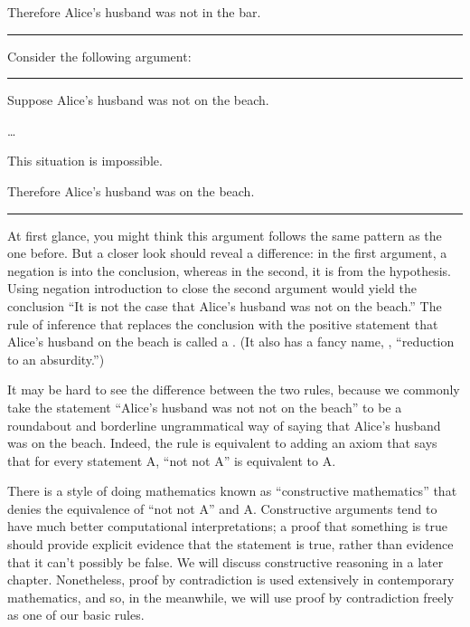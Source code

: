 \documentclass[letterpaper,10pt,english]{sphinxmanual}
\begin{document}
\sphinxAtStartPar
Therefore Alice’s husband was not in the bar.


\bigskip\hrule\bigskip


\sphinxAtStartPar
Consider the following argument:


\bigskip\hrule\bigskip


\sphinxAtStartPar
Suppose Alice’s husband was not on the beach.

\sphinxAtStartPar
…

\sphinxAtStartPar
This situation is impossible.

\sphinxAtStartPar
Therefore Alice’s husband was on the beach.


\bigskip\hrule\bigskip


\sphinxAtStartPar
At first glance, you might think this argument follows the same pattern as the one before. But a closer look should reveal a difference: in the first argument, a negation is  into the conclusion, whereas in the second, it is  from the hypothesis. Using negation introduction to close the second argument would yield the conclusion “It is not the case that Alice’s husband was not on the beach.” The rule of inference that replaces the conclusion with the positive statement that Alice’s husband  on the beach is called a . (It also has a fancy name, , “reduction to an absurdity.”)

\sphinxAtStartPar
It may be hard to see the difference between the two rules, because we commonly take the statement “Alice’s husband was not not on the beach” to be a roundabout and borderline ungrammatical way of saying that Alice’s husband was on the beach. Indeed, the rule is equivalent to adding an axiom that says that for every statement A, “not not A” is equivalent to A.

\sphinxAtStartPar
There is a style of doing mathematics known as “constructive mathematics” that denies the equivalence of “not not A” and A. Constructive arguments tend to have much better computational interpretations; a proof that something is true should provide explicit evidence that the statement is true, rather than evidence that it can’t possibly be false. We will discuss constructive reasoning in a later chapter. Nonetheless, proof by contradiction is used extensively in contemporary mathematics, and so, in the meanwhile, we will use proof by contradiction freely as one of our basic rules.
\end{document}
